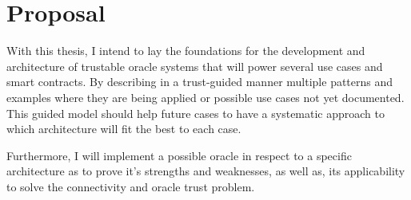 \section{Proposal}

With this thesis, I intend to lay the foundations for the development and architecture of trustable oracle systems that will power several use cases and smart contracts. By describing in a trust-guided manner multiple patterns and examples where they are being applied or possible use cases not yet documented. This guided model should help future cases to have a systematic approach to which architecture will fit the best to each case.

Furthermore, I will implement a possible oracle in respect to a specific architecture as to prove it's strengths and weaknesses, as well as, its applicability to solve the connectivity and oracle trust problem.
